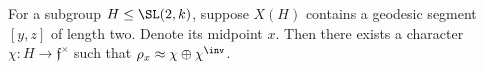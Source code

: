 \documentclass{amsart}
\begin{document}


\begin{lemma}
	For a subgroup $H \leq \SL(2,k)$, suppose $X(H)$ contains a geodesic segment $[y,z]$ of length two. Denote its midpoint $x$. Then there exists a character $\chi : H \to \mathfrak{f}^{\times}$ such that $\rho_{x} \approx \chi \oplus \chi^{\inv}$.
\end{lemma}
\end{document}
